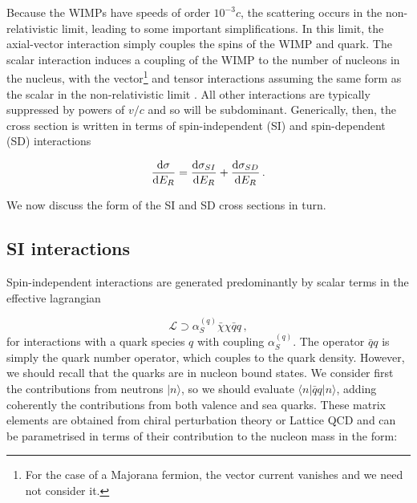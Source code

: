 Because the WIMPs have speeds of order $10^{-3} c$, the scattering occurs in the non-relativistic limit, leading to some important simplifications. In this limit, the axial-vector interaction simply couples the spins of the WIMP and quark. The scalar interaction induces a coupling of the WIMP to the number of nucleons in the nucleus, with the vector\footnote{For the case of a Majorana fermion, the vector current vanishes and we need not consider it.} and tensor interactions assuming the same form as the scalar in the non-relativistic limit \cite{Jungman:1995}. All other interactions are typically suppressed by powers of $v/c$ and so will be subdominant. Generically, then, the cross section is written in terms of spin-independent (SI) and spin-dependent (SD) interactions \cite{Goodman:1985}


\begin{equation}
\frac{\mathrm{d}\sigma}{\mathrm{d}E_R} = \frac{\mathrm{d}\sigma_{SI}}{\mathrm{d}E_R} + \frac{\mathrm{d}\sigma_{SD}}{\mathrm{d}E_R}\,.
\end{equation}

We now discuss the form of the SI and SD cross sections in turn.

\subsection{SI interactions}

Spin-independent interactions are generated predominantly by scalar terms in the effective lagrangian

\begin{equation}
\label{eq:ScalarInt}
\mathcal{L} \supset \alpha_S^{(q)} \bar{\chi} \chi \bar{q} q \,,
\end{equation}
for interactions with a quark species $q$ with coupling $\alpha_S^{(q)}$. The operator $\bar{q} q$ is simply the quark number operator, which couples to the quark density. However, we should recall that the quarks are in nucleon bound states. We consider first the contributions from neutrons $|n\rangle$, so we should evaluate $\langle n|\bar{q}q|n\rangle$, adding coherently the contributions from both valence and sea quarks. These matrix elements are obtained from chiral perturbation theory \cite{Alarcon:2012} or Lattice QCD \cite{Bali:2012} and can be parametrised in terms of their contribution to the nucleon mass in the form:

